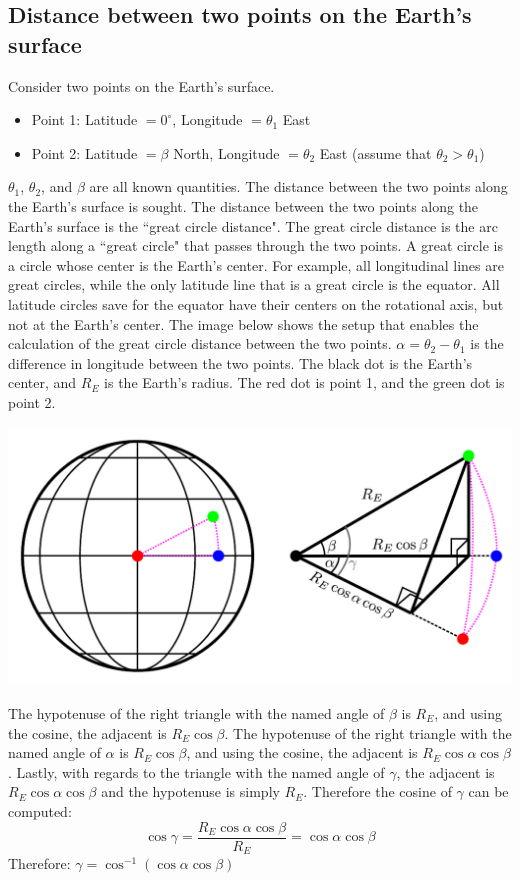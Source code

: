 \documentclass{article}
\begin{document}
\subsection{Distance between two points on the Earth's surface}

Consider two points on the Earth's surface. 
\begin{itemize}
\item Point 1: Latitude \( = 0^\circ\), Longitude \(= \theta_1\) East
\item Point 2: Latitude \( = \beta\) North, Longitude \(= \theta_2\) East (assume that \(\theta_2 > \theta_1\))
\end{itemize}

\(\theta_1\), \(\theta_2\), and \(\beta\) are all known quantities. The distance between the two points along the Earth's surface is sought. The distance between the two points along the Earth's surface is the ``great circle distance". The great circle distance is the arc length along a ``great circle" that passes through the two points. A great circle is a circle whose center is the Earth's center. For example, all longitudinal lines are great circles, while the only latitude line that is a great circle is the equator. All latitude circles save for the equator have their centers on the rotational axis, but not at the Earth's center. The image below shows the setup that enables the calculation of the great circle distance between the two points. \(\alpha = \theta_2 - \theta_1\) is the difference in longitude between the two points. The black dot is the Earth's center, and \(R_E\) is the Earth's radius. The red dot is point 1, and the green dot is point 2.

\includegraphics[width = \textwidth]{distances_with_latitude_and_longitude}

The hypotenuse of the right triangle with the named angle of \(\beta\) is \(R_E\), and using the cosine, the adjacent is \(R_E \cos\beta\). The hypotenuse of the right triangle with the named angle of \(\alpha\) is \(R_E \cos\beta\), and using the cosine, the adjacent is \(R_E \cos\alpha \cos\beta\). Lastly, with regards to the triangle with the named angle of \(\gamma\), the adjacent is \(R_E \cos\alpha \cos\beta\) and the hypotenuse is simply \(R_E\). Therefore the cosine of \(\gamma\) can be computed:
\[\cos\gamma = \frac{R_E \cos\alpha \cos\beta}{R_E} = \cos\alpha \cos\beta\]
Therefore: \(\gamma = \cos^{-1}(\cos\alpha \cos\beta)\)
\end{document}
